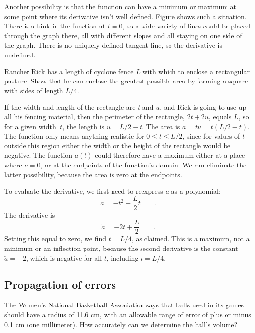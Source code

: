 Another possibility is that the function can have a minimum or maximum at some point where its derivative
isn't well defined. Figure  shows such a situation. There is a kink in the function at $t=0$,
so a wide variety of lines could be placed through the graph there, all with different slopes and all staying
on one side of the graph. There is no uniquely defined tangent line, so the derivative is undefined.

\begin{eg}
\egquestion Rancher Rick has a length of cyclone fence $L$ with which to enclose a rectangular pasture.
Show that he can enclose the greatest possible area by forming a square with sides of length $L/4$.

\eganswer If the width and length of the rectangle are $t$ and $u$, and Rick is going to use up
all his fencing material, then the perimeter of the rectangle, $2t+2u$, equals $L$, so for a given
width, $t$, the length is $u=L/2-t$. The area is $a=tu=t(L/2-t)$. The function only means anything realistic
for $0\le t\le L/2$, since for values of $t$ outside this region either the width or the height of the
rectangle would be negative. The function $a(t)$ could therefore have a maximum either at a place
where $\dot{a}=0$, or at the endpoints of the function's domain. We can eliminate the latter possibility,
because the area is zero at the endpoints.

To evaluate the derivative, we first need to reexpress $a$ as a polynomial:
\begin{equation*}
  a=-t^2+\frac{L}{2}t \qquad .
\end{equation*}
The derivative is
\begin{equation*}
  \dot{a}=-2t+\frac{L}{2} \qquad .
\end{equation*}
Setting this equal to zero, we find $t=L/4$, as claimed. This is a maximum, not a minimum or an
inflection point, because the second derivative is the constant $\ddot{a}=-2$, which is negative
for all $t$, including $t=L/4$.
\end{eg}

\subsection{Propagation of errors}

The Women's National Basketball Association says that balls used in its games should have
a radius of 11.6 cm, with an allowable range of error of plus or minus 0.1 cm (one millimeter).
How accurately can we determine the ball's volume?

